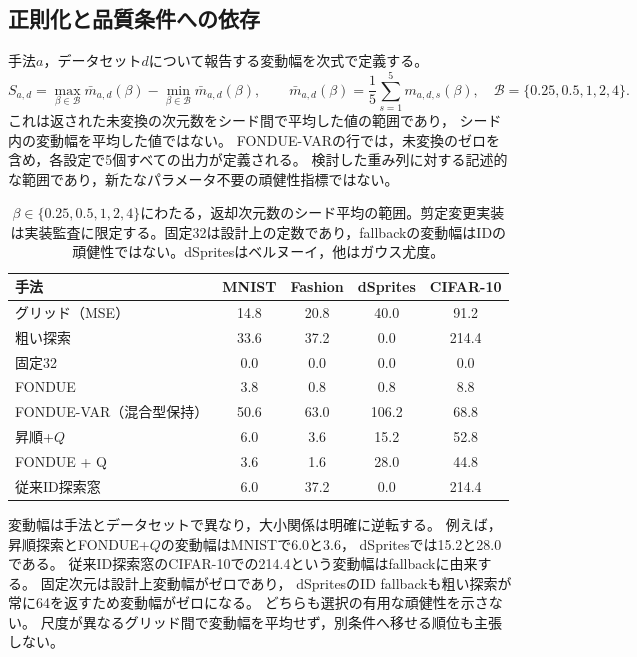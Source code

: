 \documentclass[11pt,a4paper]{ltjsarticle}
\begin{document}
\subsection{正則化と品質条件への依存}\label{sec:beta}
手法$a$，データセット$d$について報告する変動幅を次式で定義する。
\begin{equation}
 S_{a,d}=\max_{\beta\in\mathcal B}\bar m_{a,d}(\beta)
         -\min_{\beta\in\mathcal B}\bar m_{a,d}(\beta),\qquad
 \bar m_{a,d}(\beta)=\frac15\sum_{s=1}^{5}m_{a,d,s}(\beta),
 \quad\mathcal B=\{0.25,0.5,1,2,4\}.
 \label{eq:span}
\end{equation}
これは返された未変換の次元数をシード間で平均した値の範囲であり，
シード内の変動幅を平均した値ではない。
FONDUE-VARの行では，未変換のゼロを含め，各設定で5個すべての出力が定義される。
検討した重み列に対する記述的な範囲であり，新たなパラメータ不要の頑健性指標ではない。

\begin{table}[H]
\caption{$\beta\in\{0.25,0.5,1,2,4\}$にわたる，返却次元数のシード平均の範囲。剪定変更実装は実装監査に限定する。固定32は設計上の定数であり，fallbackの変動幅はIDの頑健性ではない。dSpritesはベルヌーイ，他はガウス尤度。}\label{tab:span}
\small
\setlength{\tabcolsep}{3.5pt}
\begin{tabular*}{\textwidth}{@{\extracolsep{\fill}}lcccc@{}}
\toprule
手法 & MNIST & Fashion & dSprites & CIFAR-10 \\
\midrule
グリッド（MSE） & 14.8 & 20.8 & 40.0 & 91.2 \\
粗い探索 & 33.6 & 37.2 & 0.0 & 214.4 \\
固定32 & 0.0 & 0.0 & 0.0 & 0.0 \\
FONDUE & 3.8 & 0.8 & 0.8 & 8.8 \\
FONDUE-VAR（混合型保持） & 50.6 & 63.0 & 106.2 & 68.8 \\
昇順+$Q$ & 6.0 & 3.6 & 15.2 & 52.8 \\
FONDUE + Q & 3.6 & 1.6 & 28.0 & 44.8 \\
従来ID探索窓 & 6.0 & 37.2 & 0.0 & 214.4 \\
\bottomrule
\end{tabular*}
\end{table}

変動幅は手法とデータセットで異なり，大小関係は明確に逆転する。
例えば，昇順探索とFONDUE+$Q$の変動幅はMNISTで6.0と3.6，
dSpritesでは15.2と28.0である。
従来ID探索窓のCIFAR-10での214.4という変動幅はfallbackに由来する。
固定次元は設計上変動幅がゼロであり，
dSpritesのID fallbackも粗い探索が常に64を返すため変動幅がゼロになる。
どちらも選択の有用な頑健性を示さない。
尺度が異なるグリッド間で変動幅を平均せず，別条件へ移せる順位も主張しない。
\end{document}
